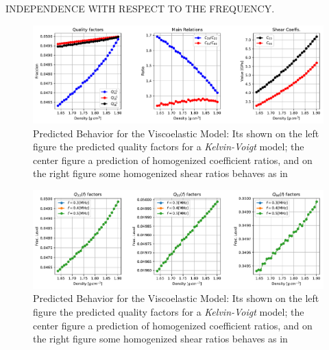 INDEPENDENCE WITH RESPECT TO THE FREQUENCY.
\begin{figure}[!h]
	\centering
	\includegraphics[width=\textwidth]{images/Qfactors/CellProb_QfactorCircular5E-2_Relations.pdf}
	\caption{Predicted Behavior for the Viscoelastic Model: Its shown on the left figure the predicted quality factors for a \textit{Kelvin-Voigt} model; the center figure a prediction of homogenized coefficient ratios, and on the right figure some homogenized shear ratios behaves as in \cite{Bernard2015} }
	\label{PredictionHomCoeffs-Qfactor}
\end{figure} 
\begin{figure}[!h]
	\centering
	\includegraphics[width=\textwidth]{images/Qfactors/QfactorsFreqsEPS5-2.pdf}
	\caption{Predicted Behavior for the Viscoelastic Model: Its shown on the left figure the predicted quality factors for a \textit{Kelvin-Voigt} model; the center figure a prediction of homogenized coefficient ratios, and on the right figure some homogenized shear ratios behaves as in \cite{Bernard2015} }
	\label{PredictionHomCoeffs-Qfactor}
\end{figure} 




